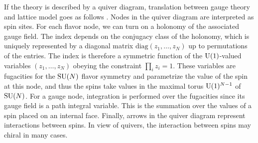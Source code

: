 If the theory is described by a quiver diagram, translation between gauge
theory and lattice model goes as follows \cite{Yamazaki:2012cp,Yamazaki:2013nra}.
Nodes in the quiver diagram are interpreted as spin sites. For each flavor node, we can
turn on a holonomy of the associated gauge field. The index depends
on the conjugacy class of the holonomy, which is uniquely represented
by a diagonal matrix $\mathrm{diag}(z_{1},\ldots,z_{N})$ up to permutations
of the entries. The index is therefore a symmetric function of the
$\mathrm{U}(1)$-valued variables $(z_{1},\ldots,z_{N})$ obeying the constraint
$\prod_i z_i=1$. These variables are fugacities for the $\mathrm{SU}(N)$
flavor symmetry and parametrize the value of the spin at this node,
and thus the spins take values in the maximal torus $\mathrm{U}(1)^{N-1}$
of $\mathrm{SU}(N)$. For a gauge node, integration is performed over the fugacities
since its gauge field is a path integral variable. This is the summation
over the values of a spin placed on an internal face. Finally, arrows in the quiver diagram
represent interactions between spins.
In view of quivers, the interaction between spins may chiral in many cases.

